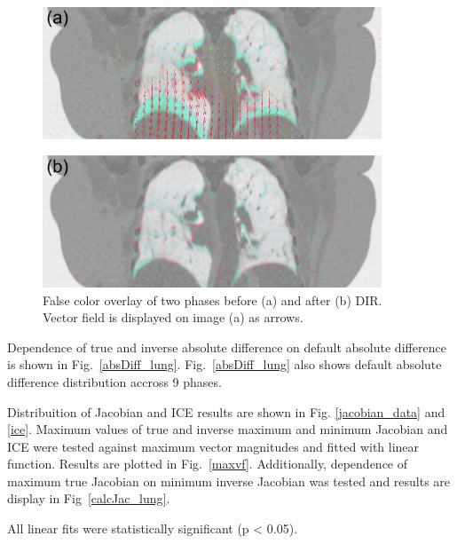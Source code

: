 \documentclass[type=dr, dr=rernat, accentcolor=tud7b,colorbacktitle, bigchapter, openright, twoside, 12pt ]{tudthesis}
\begin{document}
\begin{figure}[H]
	\begin{center}		
		\includegraphics[width=0.9\textwidth]{./Images/exampleReg.png}
		\caption{False color overlay of two phases before (a) and after (b) DIR. Vector field is displayed on image (a) as arrows.}
		\label{exampleReg_lung}
	\end{center}
\end{figure}

Dependence of true and inverse absolute difference on default absolute difference is shown in Fig.~\ref{absDiff_lung}. Fig.~\ref{absDiff_lung} also shows default absolute difference distribution accross 9 phases. 

Distribuition of Jacobian and ICE results are shown in Fig. \ref{jacobian_data} and \ref{ice}. Maximum values of true and inverse maximum and minimum Jacobian and ICE were tested against maximum vector magnitudes and fitted with linear function. Results are plotted in Fig.~\ref{maxvf}.
Additionally, dependence of maximum true Jacobian on minimum inverse Jacobian was tested and results are display in Fig~\ref{calcJac_lung}.

All linear fits were statistically significant (p < 0.05).
\end{document}
